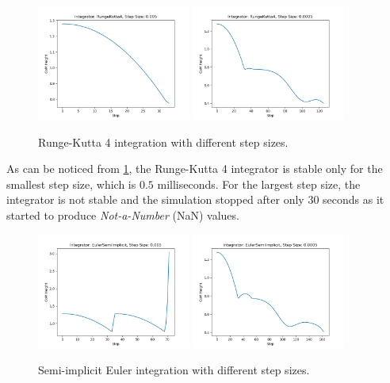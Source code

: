 \begin{figure}
    \centering
    \caption{Runge-Kutta 4 integration with different step sizes.}
    \label{fig:rk4}
    \includegraphics[width=0.45\textwidth]{Images/rk4_5ms.png}
    \includegraphics[width=0.45\textwidth]{Images/rk4_05ms.png}
\end{figure}

As can be noticed from \cref{fig:rk4}, the Runge-Kutta 4 integrator is stable only for the smallest step size, which is $0.5$ milliseconds. For the largest step size, the integrator is not stable and the simulation stopped after only $30$ seconds as it started to produce \textit{Not-a-Number} (NaN) values.

\begin{figure}
    \centering
    \caption{Semi-implicit Euler integration with different step sizes.}
    \label{fig:sie}
    \includegraphics[width=0.45\textwidth]{Images/sie_5ms.png}
    \includegraphics[width=0.45\textwidth]{Images/sie_05ms.png}
\end{figure}

